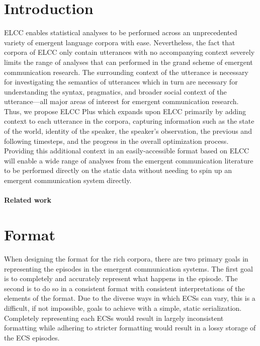 \section{Introduction}

ELCC enables statistical analyses to be performed across an unprecedented variety of emergent language corpora with ease.
Nevertheless, the fact that corpora of ELCC only contain utterances with no accompanying context severely limits the range of analyses that can performed in the grand scheme of emergent communication research.
The surrounding context of the utterance is necessary for investigating the semantics of utterances which in turn are necessary for understanding the syntax, pragmatics, and broader social context of the utterance---all major areas of interest for emergent communication research.
Thus, we propose ELCC Plus which expands upon ELCC primarily by adding context to each utterance in the corpora, capturing information such as the
  state of the world,
  identity of the speaker,
  the speaker's observation,
  the previous and following timesteps,
  and the progress in the overall optimization process.
Providing this additional context in an easily-accessible format based on ELCC will enable a wide range of analyses from the emergent communication literature to be performed directly on the static data without needing to spin up an emergent communication system directly.


\paragraph{Related work}

\phantom{}%

\section{Format}

When designing the format for the rich corpora, there are two primary goals in representing the episodes in the emergent communication systems.
The first goal is to completely and accurately represent what happens in the episode.
The second is to do so in a consistent format with consistent interpretations of the elements of the format.
Due to the diverse ways in which ECSs can vary, this is a difficult, if not impossible, goals to achieve with a simple, static serialization.
Completely representing each ECSs would result in largely inconsistent formatting while adhering to stricter formatting would result in a lossy storage of the ECS episodes.

